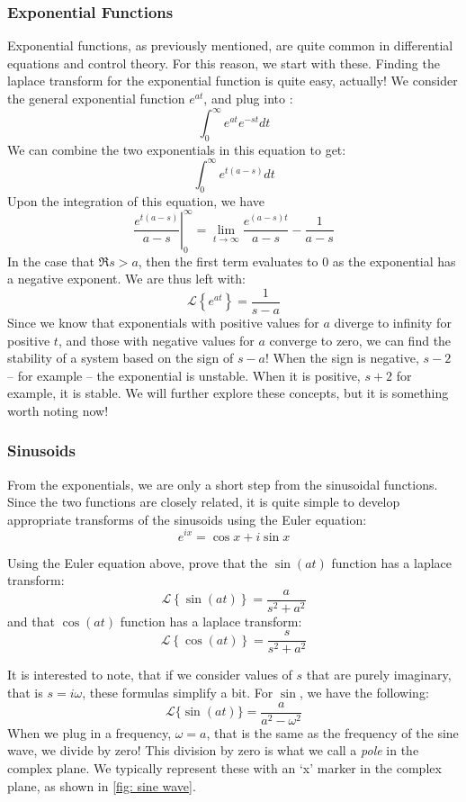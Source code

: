 \subsubsection{Exponential Functions}
Exponential functions, as previously mentioned, are quite common in differential equations and control theory. For this reason, we start with these. Finding the \gls{laplace transform} for the exponential function is quite easy, actually! We consider the general exponential function $e^{at}$, and plug into :
$$\int_0^\infty{e^{at}e^{-st}}dt$$
We can combine the two exponentials in this equation to get:
$$\int_0^\infty{e^{t(a-s)}}dt$$
Upon the integration of this equation, we have
$$\left .\frac{e^{t(a-s)}}{a-s}\right|_0^\infty=\lim_{t\rightarrow\infty}\frac{e^{(a-s)t}}{a-s}-\frac{1}{a-s}$$
In the case that $\Re s>a$, then the first term evaluates to $0$ as the exponential has a negative exponent. We are thus left with:
$$\mathscr{L}\left\{e^{at}\right\}=\frac{1}{s-a}$$
Since we know that exponentials with positive values for $a$ diverge to infinity for positive $t$, and those with negative values for $a$ converge to zero, we can find the stability of a system based on the sign of $s-a$! When the sign is negative, $s-2$ -- for example -- the exponential is unstable. When it is positive, $s+2$ for example, it is stable. We will further explore these concepts, but it is something worth noting now!

\subsubsection{Sinusoids}
From the exponentials, we are only a short step from the sinusoidal functions. Since the two functions are closely related, it is quite simple to develop appropriate transforms of the sinusoids using the Euler equation:
$$e^{ix}=\cos x+i\sin x$$
\begin{exercise}
    Using the Euler equation above, prove that the $\sin(at)$ function has a \gls{laplace transform}:
$$\mathscr{L}\left\{\sin(at)\right\}=\frac{a}{s^2+a^2}$$
and that $\cos(at)$ function has a \gls{laplace transform}:
$$\mathscr{L}\left\{\cos(at)\right\}=\frac{s}{s^2+a^2}$$
\end{exercise}

It is interested to note, that if we consider values of $s$ that are purely imaginary, that is $s=i\omega$, these formulas simplify a bit. For $\sin$, we have the following:
$$\mathscr{L}\{\sin(at)\}=\frac{a}{a^2-\omega^2}$$
When we plug in a frequency, $\omega=a$, that is the same as the frequency of the sine wave, we divide by zero! This division by zero is what we call a \textit{pole} in the complex plane. We typically represent these with an `x' marker in the complex plane, as shown in \autoref{fig: sine wave}.

